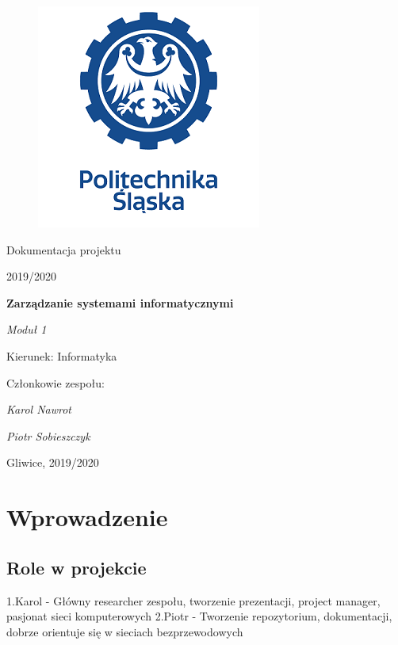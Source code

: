 \documentclass[12pt,a4paper]{article}
\begin{document}
\clearpage
\begin{figure}[h]
\centering
\includegraphics{ps-logo.png}
\end{figure}
\hspace{3cm}
\begin{center}Dokumentacja projektu\end{center}
\begin{center}2019/2020\end{center}
\hspace{3cm}
\begin{center}\large\textbf{Zarządzanie systemami informatycznymi}\end{center}
\begin{center}\large\textit{Moduł 1}\end{center}

\hspace{7cm}
\begin{flushright}Kierunek: Informatyka
\end{flushright}
\begin{flushright}Członkowie zespołu:
\par
\textit{Karol Nawrot}
\par
\textit{Piotr Sobieszczyk}
\end{flushright}
\vfill
\begin{center}Gliwice, 2019/2020\end{center}

\newpage
{}
\tableofcontents

\newpage
\section{Wprowadzenie}

\subsection{Role w projekcie}
1.Karol - Główny researcher zespołu, tworzenie prezentacji, project manager, pasjonat sieci komputerowych \newline
2.Piotr - Tworzenie repozytorium, dokumentacji, dobrze orientuje się w sieciach bezprzewodowych
\end{document}
